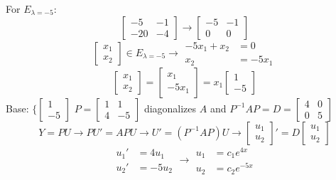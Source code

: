 \documentclass[12pt]{article}
\begin{document}
\begin{example}
For $E_{\lambda = -5}$: $$\begin{bmatrix} -5 & -1 \\ -20 & -4 \end{bmatrix} \rightarrow \begin{bmatrix} -5 & -1 \\ 0 & 0 \end{bmatrix} $$ $$\begin{bmatrix} x_1 \\ x_2 \end{bmatrix} \in E_{\lambda = -5} \rightarrow \begin{aligned} -5x_1 + x_2 &= 0 \\ x_2 &= -5x_1 \end{aligned} $$ $$\begin{bmatrix} x_1 \\ x_2 \end{bmatrix} = \begin{bmatrix} x_1 \\ -5x_1 \end{bmatrix} = x_1\begin{bmatrix} 1 \\ -5 \end{bmatrix} $$ Base: $\{\begin{bmatrix} 1 \\ -5 \end{bmatrix}$ \newline 
$P = \begin{bmatrix} 1 & 1 \\ 4 & -5 \end{bmatrix}$ diagonalizes $A$ and $P^{-1}AP = D = \begin{bmatrix} 4 & 0 \\ 0 & 5 \end{bmatrix}$ 
$$ Y = PU \rightarrow PU' = APU \rightarrow U' = (P^{-1}AP)U \rightarrow \begin{bmatrix} u_1 \\ u_2 \end{bmatrix}' = D\begin{bmatrix} u_1 \\ u_2 \end{bmatrix} $$ 
$$ \begin{aligned} u_1' &= 4u_1 \\ u_2' &= -5u_2 \end{aligned} \rightarrow \begin{aligned} u_1 &= c_1e^{4x} \\ u_2 &= c_2e^{-5x} \end{aligned} $$ 

\end{example}
\end{document}
